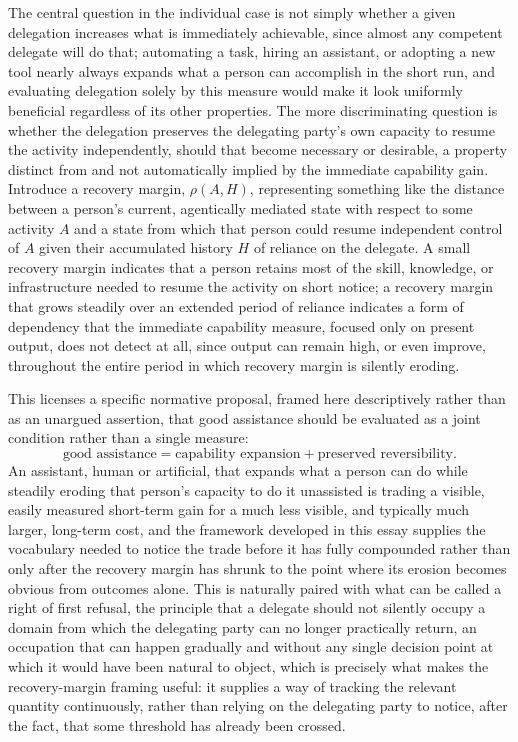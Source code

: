 \documentclass[11pt]{article}
\begin{document}
The central question in the individual case is not simply whether a given delegation increases what is immediately achievable, since almost any competent delegate will do that; automating a task, hiring an assistant, or adopting a new tool nearly always expands what a person can accomplish in the short run, and evaluating delegation solely by this measure would make it look uniformly beneficial regardless of its other properties. The more discriminating question is whether the delegation preserves the delegating party's own capacity to resume the activity independently, should that become necessary or desirable, a property distinct from and not automatically implied by the immediate capability gain. Introduce a recovery margin, $\rho(A, H)$, representing something like the distance between a person's current, agentically mediated state with respect to some activity $A$ and a state from which that person could resume independent control of $A$ given their accumulated history $H$ of reliance on the delegate. A small recovery margin indicates that a person retains most of the skill, knowledge, or infrastructure needed to resume the activity on short notice; a recovery margin that grows steadily over an extended period of reliance indicates a form of dependency that the immediate capability measure, focused only on present output, does not detect at all, since output can remain high, or even improve, throughout the entire period in which recovery margin is silently eroding.

This licenses a specific normative proposal, framed here descriptively rather than as an unargued assertion, that good assistance should be evaluated as a joint condition rather than a single measure:
$$\text{good assistance} = \text{capability expansion} + \text{preserved reversibility}.$$
An assistant, human or artificial, that expands what a person can do while steadily eroding that person's capacity to do it unassisted is trading a visible, easily measured short-term gain for a much less visible, and typically much larger, long-term cost, and the framework developed in this essay supplies the vocabulary needed to notice the trade before it has fully compounded rather than only after the recovery margin has shrunk to the point where its erosion becomes obvious from outcomes alone. This is naturally paired with what can be called a right of first refusal, the principle that a delegate should not silently occupy a domain from which the delegating party can no longer practically return, an occupation that can happen gradually and without any single decision point at which it would have been natural to object, which is precisely what makes the recovery-margin framing useful: it supplies a way of tracking the relevant quantity continuously, rather than relying on the delegating party to notice, after the fact, that some threshold has already been crossed.
\end{document}
